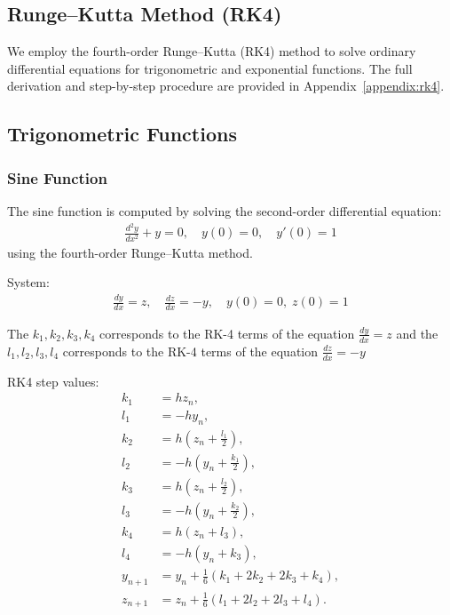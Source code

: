 \documentclass[conference]{IEEEtran}
\begin{document}
\subsection{Runge--Kutta Method (RK4)}
We employ the fourth-order Runge--Kutta (RK4) method \cite{grewal2014,kreyszig2011} 
to solve ordinary differential equations for trigonometric and exponential functions.
The full derivation and step-by-step procedure are provided in Appendix~\ref{appendix:rk4}.

\subsection{Trigonometric Functions}

\subsubsection{Sine Function} 
The sine function \cite{ncert12} is computed by solving the second-order differential equation:
\begin{align}
\frac{d^2y}{dx^2} + y = 0, \quad y(0)=0, \quad y'(0)=1
\end{align}
using the fourth-order Runge--Kutta method.

System:
\begin{align}
\frac{dy}{dx}=z, \quad \frac{dz}{dx}=-y, \quad y(0)=0, \; z(0)=1
\end{align}

The $ k_1,k_2,k_3,k_4 $ corresponds to the RK-4 terms of the equation $ \frac{dy}{dx}=z $ and the $ l_1,l_2,l_3,l_4 $ corresponds to the RK-4 terms of the equation $ \frac{dz}{dx}=-y $

RK4 step values:
\begin{align}
k_1 &= h z_n, \\
l_1 &= -h y_n, \\
k_2 &= h \left(z_n+\tfrac{l_1}{2}\right), \\
l_2 &= -h \left(y_n+\tfrac{k_1}{2}\right), \\
k_3 &= h \left(z_n+\tfrac{l_2}{2}\right), \\
l_3 &= -h \left(y_n+\tfrac{k_2}{2}\right), \\
k_4 &= h(z_n+l_3), \\
l_4 &= -h(y_n+k_3), \\
y_{n+1} &= y_n+\frac{1}{6}(k_1+2k_2+2k_3+k_4), \\
z_{n+1} &= z_n+\tfrac{1}{6}(l_1+2l_2+2l_3+l_4).
\end{align}
\end{document}
